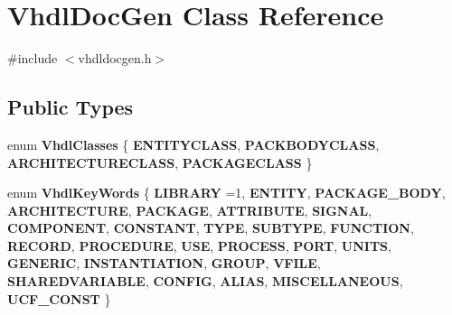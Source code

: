 \hypertarget{class_vhdl_doc_gen}{}\section{Vhdl\+Doc\+Gen Class Reference}
\label{class_vhdl_doc_gen}


{\ttfamily \#include $<$vhdldocgen.\+h$>$}

\subsection*{Public Types}
\begin{DoxyCompactItemize}
\item 
\mbox{\label{class_vhdl_doc_gen_a010ab08982f29df8c0f3d3f0f642f0f0}} 
enum {\bfseries Vhdl\+Classes} \{ {\bfseries E\+N\+T\+I\+T\+Y\+C\+L\+A\+SS}, 
{\bfseries P\+A\+C\+K\+B\+O\+D\+Y\+C\+L\+A\+SS}, 
{\bfseries A\+R\+C\+H\+I\+T\+E\+C\+T\+U\+R\+E\+C\+L\+A\+SS}, 
{\bfseries P\+A\+C\+K\+A\+G\+E\+C\+L\+A\+SS}
 \}
\item 
\mbox{\label{class_vhdl_doc_gen_a3f46a86d0561edb71388774696f6cea6}} 
enum {\bfseries Vhdl\+Key\+Words} \{ \newline
{\bfseries L\+I\+B\+R\+A\+RY} =1, 
{\bfseries E\+N\+T\+I\+TY}, 
{\bfseries P\+A\+C\+K\+A\+G\+E\+\_\+\+B\+O\+DY}, 
{\bfseries A\+R\+C\+H\+I\+T\+E\+C\+T\+U\+RE}, 
\newline
{\bfseries P\+A\+C\+K\+A\+GE}, 
{\bfseries A\+T\+T\+R\+I\+B\+U\+TE}, 
{\bfseries S\+I\+G\+N\+AL}, 
{\bfseries C\+O\+M\+P\+O\+N\+E\+NT}, 
\newline
{\bfseries C\+O\+N\+S\+T\+A\+NT}, 
{\bfseries T\+Y\+PE}, 
{\bfseries S\+U\+B\+T\+Y\+PE}, 
{\bfseries F\+U\+N\+C\+T\+I\+ON}, 
\newline
{\bfseries R\+E\+C\+O\+RD}, 
{\bfseries P\+R\+O\+C\+E\+D\+U\+RE}, 
{\bfseries U\+SE}, 
{\bfseries P\+R\+O\+C\+E\+SS}, 
\newline
{\bfseries P\+O\+RT}, 
{\bfseries U\+N\+I\+TS}, 
{\bfseries G\+E\+N\+E\+R\+IC}, 
{\bfseries I\+N\+S\+T\+A\+N\+T\+I\+A\+T\+I\+ON}, 
\newline
{\bfseries G\+R\+O\+UP}, 
{\bfseries V\+F\+I\+LE}, 
{\bfseries S\+H\+A\+R\+E\+D\+V\+A\+R\+I\+A\+B\+LE}, 
{\bfseries C\+O\+N\+F\+IG}, 
\newline
{\bfseries A\+L\+I\+AS}, 
{\bfseries M\+I\+S\+C\+E\+L\+L\+A\+N\+E\+O\+US}, 
{\bfseries U\+C\+F\+\_\+\+C\+O\+N\+ST}
 \}
\end{DoxyCompactItemize}
